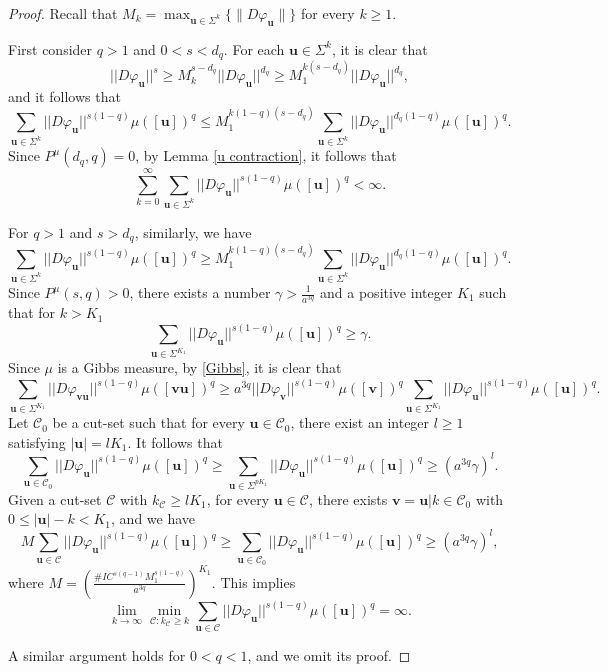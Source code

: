 \documentclass[12pt]{amsart}
\theoremstyle{plain}
\theoremstyle{definition}
\theoremstyle{remark}
\begin{document}
\begin{proof}
Recall that $M_k=\max_{\mathbf{u} \in \Sigma^k} \{\|D\varphi_\mathbf{u}\|\}$ for every $k\geq 1$. 

First consider  $q>1$ and  $0<s<d_q$.  For each $\mathbf{u}\in\Sigma^k$, it is clear that 
$$
||D\varphi_\mathbf{u}||^s\ge    M_k^{s-d_q}        ||D\varphi_\mathbf{u}||^{d_q}\ge M_1^{k(s-d_q)}||D\varphi_\mathbf{u}||^{d_q},
$$
and it follows that 
$$
\sum_{\mathbf{u}\in \Sigma^k}||D\varphi_\mathbf{u}||^{s(1-q)}\mu([\mathbf{u}])^q\le M_1^{k(1-q)(s-d_q)}\sum_{\mathbf{u}\in \Sigma^k}||D\varphi_\mathbf{u}||^{d_q(1-q)}\mu([\mathbf{u}])^q.
$$          
Since $P^\mu(d_q,q)=0$, by Lemma \ref{u contraction}, it follows that
$$
\sum_{k=0}^\infty\sum_{\mathbf{u}\in \Sigma^k}||D\varphi_\mathbf{u}||^{s(1-q)}\mu([\mathbf{u}])^q<\infty.
$$             


For $q>1$ and $s>d_q$, similarly, we have  
$$
\sum_{\mathbf{u}\in \Sigma^k}||D\varphi_\mathbf{u}||^{s(1-q)}\mu([\mathbf{u}])^q\ge M_1^{k(1-q)(s-d_q)}\sum_{\mathbf{u}\in \Sigma^k}||D\varphi_\mathbf{u}||^{d_q(1-q)}\mu([\mathbf{u}])^q.
$$
Since $P^\mu(s,q)>0$, there exists a number $\gamma>\frac{1}{a^{3q}}$ and a positive integer $K_1$ such that for $k>K_1$
$$
\sum_{\mathbf{u}\in \Sigma^{K_1}}||D\varphi_\mathbf{u}||^{s(1-q)}\mu([\mathbf{u}])^q\ge\gamma.
$$
Since $\mu$ is a Gibbs measure, by \eqref{Gibbs}, it is clear that 
$$
\sum_{\mathbf{u}\in \Sigma^{K_1}}||D\varphi_\mathbf{vu}||^{s(1-q)}\mu([\mathbf{vu}])^q\ge a^{3q}||D\varphi_\mathbf{v}||^{s(1-q)}\mu([\mathbf{v}])^q\sum_{\mathbf{u}\in \Sigma^{K_1}}||D\varphi_\mathbf{u}||^{s(1-q)}\mu([\mathbf{u}])^q. 
$$
Let $\mathcal{C}_0$ be a cut-set such that  for every $\mathbf{u}\in \mathcal{C}_0$, there exist an integer $l\geq 1$  satisfying   $|\mathbf{u}|=l K_1$. It follows that 
$$
 \sum_{\mathbf{u}\in \mathcal{C}_0}||D\varphi_\mathbf{u}||^{s(1-q)}\mu([\mathbf{u}])^q\ge \sum_{\mathbf{u}\in \Sigma^{p{K_1}}}||D\varphi_\mathbf{u}||^{s(1-q)}\mu([\mathbf{u}])^q\ge(a^{3q}\gamma)^l.
$$
Given a cut-set $\mathcal{C}$ with $k_\mathcal{C}\ge l{K_1}$,  for every $\mathbf{u}\in\mathcal{C}$, there exists $\mathbf{v}=\mathbf{u}|k\in\mathcal{C}_0$ with $0\le|\mathbf{u}|-k<{K_1}$, and we have 
$$
M\sum_{\mathbf{u}\in \mathcal{C}}||D\varphi_\mathbf{u}||^{s(1-q)}\mu([\mathbf{u}])^q\ge\sum_{\mathbf{u}\in \mathcal{C}_0}||D\varphi_\mathbf{u}||^{s(1-q)}\mu([\mathbf{u}])^q\ge(a^{3q}\gamma)^l,
$$
where $M=(\frac{\# IC^{s(q-1)}M_1^{s(1-q)}}{a^{3q}})^{K_1}$.  This implies
$$
\lim_{k\to\infty}\min_{\mathcal{C}:k_\mathcal{C}\ge k}\sum_{\mathbf{u}\in\mathcal{C}}||D\varphi_\mathbf{u}||^{s(1-q)}\mu([\mathbf{u}])^q=\infty.
$$

A similar argument holds for $0<q<1$,  and we omit its proof.
\end{proof}
\end{document}
